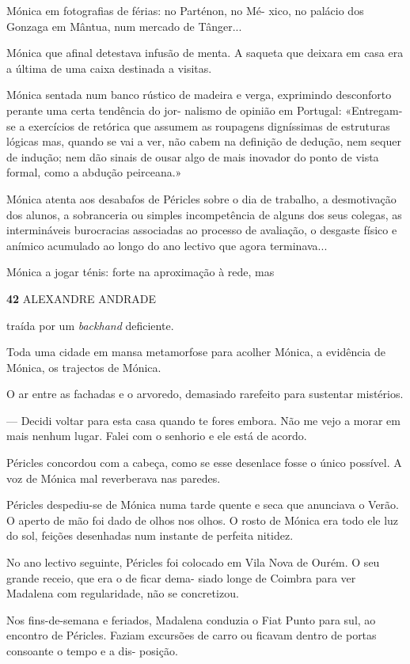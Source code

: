 Mónica em fotografias de férias: no Parténon, no Mé- xico, no palácio
dos Gonzaga em Mântua, num mercado de Tânger...

Mónica que afinal detestava infusão de menta. A saqueta que deixara em
casa era a última de uma caixa destinada a visitas.

Mónica sentada num banco rústico de madeira e verga, exprimindo
desconforto perante uma certa tendência do jor- nalismo de opinião em
Portugal: «Entregam-se a exercícios de retórica que assumem as roupagens
digníssimas de estruturas lógicas mas, quando se vai a ver, não cabem na
definição de dedução, nem sequer de indução; nem dão sinais de ousar
algo de mais inovador do ponto de vista formal, como a abdução
peirceana.»

Mónica atenta aos desabafos de Péricles sobre o dia de trabalho, a
desmotivação dos alunos, a sobranceria ou simples incompetência de
alguns dos seus colegas, as intermináveis burocracias associadas ao
processo de avaliação, o desgaste físico e anímico acumulado ao longo do
ano lectivo que agora terminava...

Mónica a jogar ténis: forte na aproximação à rede, mas

\textbf{42 }ALEXANDRE ANDRADE

traída por um \emph{backhand }deficiente.

Toda uma cidade em mansa metamorfose para acolher Mónica, a evidência de
Mónica, os trajectos de Mónica.

O ar entre as fachadas e o arvoredo, demasiado rarefeito para sustentar
mistérios.

--- Decidi voltar para esta casa quando te fores embora. Não me vejo a
morar em mais nenhum lugar. Falei com o senhorio e ele está de acordo.

Péricles concordou com a cabeça, como se esse desenlace fosse o único
possível. A voz de Mónica mal reverberava nas paredes.

Péricles despediu-se de Mónica numa tarde quente e seca que anunciava o
Verão. O aperto de mão foi dado de olhos nos olhos. O rosto de Mónica
era todo ele luz do sol, feições desenhadas num instante de perfeita
nitidez.

No ano lectivo seguinte, Péricles foi colocado em Vila Nova de Ourém. O
seu grande receio, que era o de ficar dema- siado longe de Coimbra para
ver Madalena com regularidade, não se concretizou.

Nos fins-de-semana e feriados, Madalena conduzia o Fiat Punto para sul,
ao encontro de Péricles. Faziam excursões de carro ou ficavam dentro de
portas consoante o tempo e a dis- posição.

